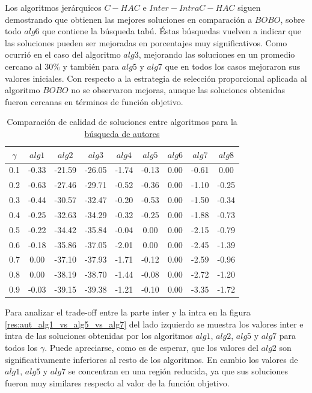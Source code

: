 Los algoritmos jerárquicos $C-HAC$ e $Inter-Intra C-HAC$ siguen demostrando que obtienen las mejores soluciones en comparación a $BOBO$, sobre todo $alg6$ que contiene la búsqueda tabú. Éstas búsquedas vuelven a indicar que las soluciones pueden ser mejoradas en porcentajes muy significativos. Como ocurrió en el caso del algoritmo $alg3$, mejorando las soluciones en un promedio cercano al $30\%$ y también para $alg5$ y $alg7$ que en todos los casos mejoraron sus valores iniciales. Con respecto a la estrategia de selección proporcional aplicada al algoritmo $BOBO$ no se observaron mejoras, aunque las soluciones obtenidas fueron cercanas en términos de función objetivo. 

\begin{table}[H]
\begin{center}
\begin{tabular}{|c|c|c|c|c|c|c|c|c|}
\hline
$\gamma$&$alg1$&$alg2$&$alg3$&$alg4$&$alg5$&$alg6$&$alg7$&$alg8$ \\ \hline
0.1 & -0.33 & -21.59 & -26.05 & -1.74 & -0.13 & 0.00 & -0.61 & 0.00 \\
0.2 & -0.63 & -27.46 & -29.71 & -0.52 & -0.36 & 0.00 & -1.10 & -0.25 \\
0.3 & -0.44 & -30.57 & -32.47 & -0.20 & -0.53 & 0.00 & -1.50 & -0.34 \\
0.4 & -0.25 & -32.63 & -34.29 & -0.32 & -0.25 & 0.00 & -1.88 & -0.73 \\
0.5 & -0.22 & -34.42 & -35.84 & -0.04 & 0.00 & 0.00 & -2.15 & -0.79 \\
0.6 & -0.18 & -35.86 & -37.05 & -2.01 & 0.00 & 0.00 & -2.45 & -1.39 \\
0.7 & 0.00 & -37.10 & -37.93 & -1.71 & -0.12 & 0.00 & -2.59 & -0.96 \\ 
0.8 & 0.00 & -38.19 & -38.70 & -1.44 & -0.08 & 0.00 & -2.72 & -1.20 \\
0.9 & -0.03 & -39.15 & -39.38 & -1.21 & -0.10 & 0.00 & -3.35 & -1.72 \\ \hline 
\end{tabular}
\caption{Comparación de calidad de soluciones entre algoritmos para la \hyperref[busqueda:autores]{búsqueda de autores}} 
\label{tabla:comp2}
\end{center}
\end{table}

Para analizar el trade-off entre la parte inter y la intra en la figura \ref{res:aut_alg1_vs_alg5_vs_alg7} del lado izquierdo se muestra los valores inter e intra de las soluciones obtenidas por los algoritmos $alg1$, $alg2$, $alg5$ y $alg7$ para todos los $\gamma$. Puede apreciarse, como es de esperar, que los valores del $alg2$ son significativamente inferiores al resto de los algoritmos. En cambio los valores de $alg1$, $alg5$ y $alg7$ se concentran en una región reducida, ya que sus soluciones fueron muy similares respecto al valor de la función objetivo.

